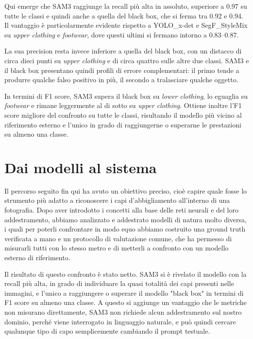 \noindent
Qui emerge che SAM3 raggiunge la recall più alta in assoluto, superiore a 0.97 su tutte le classi e quindi anche a quella del black box, che si ferma tra 0.92 e 0.94.
Il vantaggio è particolarmente evidente rispetto a YOLO\_x-det e SegF\_StyleMix su \textit{upper clothing} e \textit{footwear}, dove questi ultimi si fermano intorno a 0.83--0.87.

\noindent
La sua precision resta invece inferiore a quella del black box, con un distacco di circa dieci punti su \textit{upper clothing} e di circa quattro sulle altre due classi.
SAM3 e il black box presentano quindi profili di errore complementari: il primo tende a produrre qualche falso positivo in più, il secondo a tralasciare qualche oggetto.

\noindent
In termini di F1 score, SAM3 supera il black box su \textit{lower clothing}, lo eguaglia su \textit{footwear} e rimane leggermente al di sotto su \textit{upper clothing}.
Ottiene inoltre l'F1 score migliore del confronto su tutte le classi, risultando il modello più vicino al riferimento esterno e l'unico in grado di raggiungerne o superarne le prestazioni su almeno una classe.

\newpage

\section{Dai modelli al sistema}

Il percorso seguito fin qui ha avuto un obiettivo preciso, cioè capire quale fosse lo strumento più adatto a riconoscere i capi d'abbigliamento all'interno di una fotografia.
Dopo aver introdotto i concetti alla base delle reti neurali e del loro addestramento, abbiamo analizzato e addestrato modelli di natura molto diversa, i quali per poterli confrontare in modo equo
abbiamo costruito una ground truth verificata a mano e un protocollo di valutazione comune, che ha permesso di misurarli tutti con lo stesso metro e di metterli a confronto con un modello esterno di riferimento.

Il risultato di questo confronto è stato netto. SAM3 si è rivelato il modello con la recall più alta, in grado di individuare la quasi totalità dei capi presenti nelle immagini,
e l'unico a raggiungere o superare il modello "black box" in termini di F1 score su almeno una classe.
A questo si aggiunge un vantaggio che le metriche non misurano direttamente, SAM3 non richiede alcun addestramento sul nostro dominio, perché viene interrogato in linguaggio naturale,
e può quindi cercare qualunque tipo di capo semplicemente cambiando il prompt testuale.

